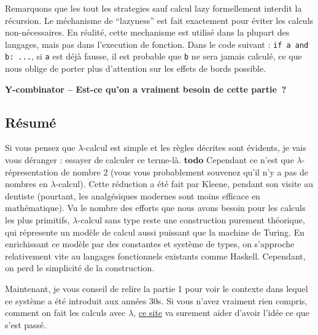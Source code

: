\documentclass[12pt, a4paper]{article}
\begin{document}
Remarquons que les tout les strategies sauf calcul lazy formellement interdit la récursion.
Le méchanisme de ``lazyness'' est fait exactement pour éviter les calculs non-nécessaires.
En réalité, cette mechanisme est utilisé dans la plupart des langages, mais pas dans l'execution de fonction. Dans le code suivant : \verb|if a and b: ...|, si \verb|a| est déjà fausse, il est probable que \verb|b| ne sera jamais calculé, ce que nous oblige de porter plus d'attention sur les effets de bords possible.

\textbf{Y-combinator -- Est-ce qu'on a vraiment besoin de cette partie~?}

\subsection*{Résumé}
Si vous pensez que $\lambda$-calcul est simple et les règles décrites sont évidents, je vais vous déranger : essayer de calculer ce terme-là.
\textbf{todo}
Cependant ce n'est que $\lambda$-répresentation de nombre 2 (vous vous probablement souvenez qu'il n'y a pas de nombres en $\lambda$-calcul).
Cette réduction a été fait par Kleene, pendant son visite au dentiste (pourtant, les analgésiques modernes sont moins efficace en mathématique).
Vu le nombre des efforts que nous avons besoin pour les calculs les plus primitifs, $\lambda$-calcul sans type reste une construction purement théorique, qui répresente un modèle de calcul aussi puissant que la machine de Turing.
En enrichissant ce modèle par des constantes et système de types, on s'approche relativement vite au langages fonctionnels existants comme Haskell.
Cependant, on perd le simplicité de la construction.

Maintenant, je vous conseil de relire la partie 1 pour voir le contexte dans lequel ce système a été introduit aux années 30s.
Si vous n'avez vraiment rien compris, comment on fait les calculs avec $\lambda$, \href{http://worrydream.com/AlligatorEggs/}{ce site} va surement aider d'avoir l'idée ce que s'est passé.
\end{document}
